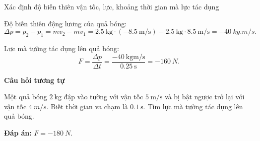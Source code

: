 \begin{dang}{Xác định độ biến thiên vận tốc, lực, khoảng thời gian mà lực tác dụng}
{		Độ biến thiên động lương của quả bóng:
		$$\Delta p =p_2-p_1=mv_2-mv_1=\SI{2.5}{\kilogram}\cdot(\SI{-8.5}{\meter/\second})-\SI{2.5}{\kilogram}\cdot\SI{8.5}{\meter/\second}= \SI{-40}{kg.m/s}.$$
		
		Lưc mà tường tác dụng lên quả bóng: $$F=\dfrac{\Delta p}{\Delta t} =\dfrac{\SI{-40}{\kilogram\meter/\second}}{\SI{0.25}{\second}}= \SI{-160}{N}.$$
		
		\begin{center}
			\textbf{Câu hỏi tương tự}
		\end{center}
		
		Một quả bóng $\SI{2}{\kilogram}$ đập vào tường với vận tốc $\SI{5}{\meter/\second}$ và bị bật ngược trở lại với vận tốc $\SI{4}{m/s}$. Biết thời gian va chạm là $\SI{0.1}{\second}$. Tìm lực mà tường tác dụng lên quả bóng.
		
		\textbf{Đáp án:} $F=\SI{-180}{N}$.
	}
\end{dang}
